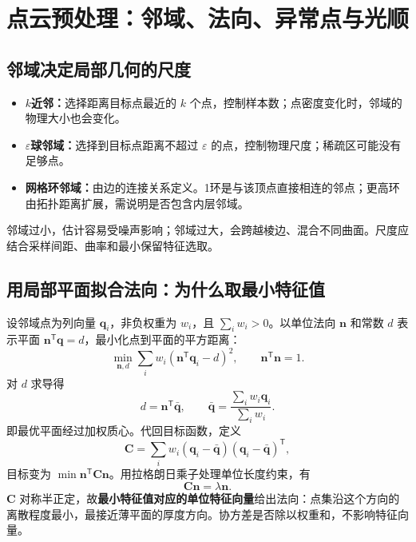 \section{点云预处理：邻域、法向、异常点与光顺}
\subsection{邻域决定局部几何的尺度}
\begin{itemize}
\item \textbf{$k$近邻：}选择距离目标点最近的 $k$ 个点，控制样本数；点密度变化时，邻域的物理大小也会变化。
\item \textbf{$\varepsilon$球邻域：}选择到目标点距离不超过 $\varepsilon$ 的点，控制物理尺度；稀疏区可能没有足够点。
\item \textbf{网格环邻域：}由边的连接关系定义。1环是与该顶点直接相连的邻点；更高环由拓扑距离扩展，需说明是否包含内层邻域。
\end{itemize}
邻域过小，估计容易受噪声影响；邻域过大，会跨越棱边、混合不同曲面。尺度应结合采样间距、曲率和最小保留特征选取。

\subsection{用局部平面拟合法向：为什么取最小特征值}
设邻域点为列向量 $\mathbf q_i$，非负权重为 $w_i$，且 $\sum_iw_i>0$。以单位法向 $\mathbf n$ 和常数 $d$ 表示平面 $\mathbf n^{\mathsf T}\mathbf q=d$，最小化点到平面的平方距离：
\[
\min_{\mathbf n,d}\sum_iw_i(\mathbf n^{\mathsf T}\mathbf q_i-d)^2,
\qquad \mathbf n^{\mathsf T}\mathbf n=1.
\]
对 $d$ 求导得
\[
d=\mathbf n^{\mathsf T}\bar{\mathbf q},\qquad
\bar{\mathbf q}=\frac{\sum_iw_i\mathbf q_i}{\sum_iw_i}.
\]
即最优平面经过加权质心。代回目标函数，定义
\[
\mathbf C=\sum_iw_i(\mathbf q_i-\bar{\mathbf q})
(\mathbf q_i-\bar{\mathbf q})^{\mathsf T},
\]
目标变为 $\min\mathbf n^{\mathsf T}\mathbf C\mathbf n$。用拉格朗日乘子处理单位长度约束，有
\[
\boxed{\mathbf C\mathbf n=\lambda\mathbf n}.
\]
$\mathbf C$ 对称半正定，故\textbf{最小特征值对应的单位特征向量}给出法向：点集沿这个方向的离散程度最小，最接近薄平面的厚度方向。协方差是否除以权重和，不影响特征向量。



